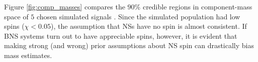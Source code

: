 Figure \ref{fig:comp_masses} compares the $90\%$ credible regions in component-mass space of $5$ chosen simulated signals \citep[cf.][figure 1]{Chatziioannou_2014}.  Since the simulated population had low spins ($\chi < 0.05$), the assumption that NSs have no spin is almost consistent.  If BNS systems turn out to have appreciable spins, however, it is evident that making strong (and wrong) prior assumptions about NS spin can drastically bias mass estimates.
  
